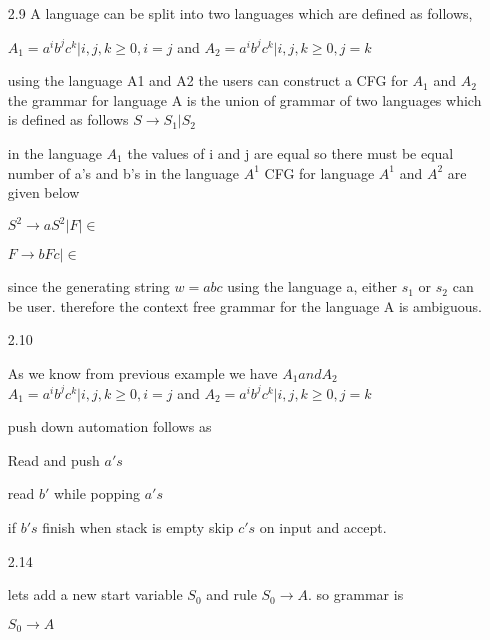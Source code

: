 \documentclass[11pt]{article}
\theoremstyle{thmstyle}
\begin{document}

\thispagestyle{firstpage} %

\setlength{\abovedisplayskip}{20pt} %
\setlength{\belowdisplayskip}{20pt} %





\begin{itemize}\setlength{\itemsep}{1em} %
\item[2.9]  
A language can be split into two languages which are defined as follows,

$A_1 = {a^i b^j c^k} | i,j,k \geq 0, i = j$  and 
$A_2 = {a^i b^j c^k} | i,j,k \geq 0, j = k$

using the language A1 and A2 the users can construct a CFG for $A_1$ and $A_2$
the grammar for language A is the union of grammar of two languages which is defined as follows  $S \rightarrow  S_1 | S_2$

in the language $A_1$ the values of i and j are equal so there must be equal number of a's and b's  in the language $A^1$
CFG for language  $A^1$ and $A^2$ are given below

$S^2 \rightarrow aS^2 | F | \in $

$F \rightarrow bFc | \in$

since the generating string $w= a b c $ using the language a, either $s_1$ or $s_2$ can be user.
therefore the context free grammar for the language A is ambiguous.

\item[2.10]  

As we know from previous example we have $A_1 and A_2$ 
$A_1 = {a^i b^j c^k} | i,j,k \geq 0, i = j$  and 
$A_2 = {a^i b^j c^k} | i,j,k \geq 0, j = k$

push down automation follows as 

Read and push $a's$

read $b'$ while popping $a's$

if $b's$ finish when stack is empty skip $c's$ on input and accept.

\item[2.14]

lets add a new start variable $S_0$ and rule $S_0 \rightarrow A.$
so grammar is

$S_0 \rightarrow A$


\end{itemize}
\end{document}
